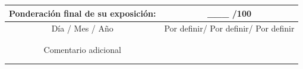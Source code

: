 \documentclass[12pt]{article}
\newcommand{\DiaEvaluacionPesentacion}{Por definir}
\newcommand{\MesEvaluacionPesentacion}{Por definir}
\newcommand{\AnhoEvaluacionPesentacion}{Por definir}
\begin{document}
\begin{longtable}{|p{3.75cm}|p{3.75cm}|p{3.75cm}|p{3.75cm}|}
\multicolumn{2}{|c|}{\textbf{Ponderación final de su exposición:}} & \multicolumn{2}{c|}{\_\_\_ /100} \\ \hline
\multicolumn{2}{|c|}{Día / Mes / Año} &  \multicolumn{2}{c|}{\DiaEvaluacionPesentacion / \MesEvaluacionPesentacion / \AnhoEvaluacionPesentacion} \\  \hline
\multicolumn{2}{|c}{ }& \multicolumn{2}{|c|}{ }  \\
\multicolumn{2}{|c}{ }& \multicolumn{2}{|c|}{ }  \\    
\multicolumn{2}{|c}{Comentario adicional} & \multicolumn{2}{|c|}{ } \\  
\multicolumn{2}{|c}{ }& \multicolumn{2}{|c|}{ }  \\  
\multicolumn{2}{|c}{ }& \multicolumn{2}{|c|}{ }  \\  \hline



\end{longtable}
\end{document}

